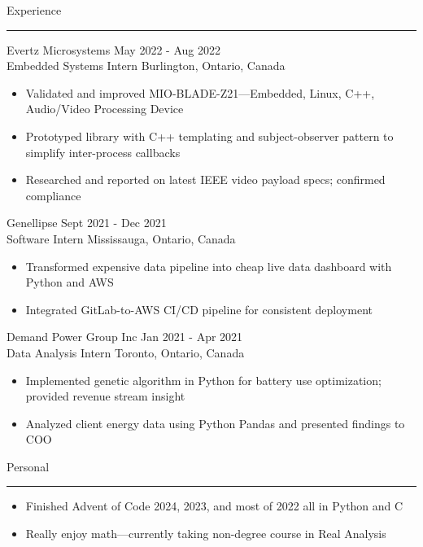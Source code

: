 \documentclass{article}
\newenvironment{mysection}[1]
{ {\large #1}

	\vspace{-1em}
	\rule{\linewidth}{0.4pt} 

} { \vspace{1em} }
\begin{document}
\begin{mysection}{Experience}
Evertz Microsystems \hfill May 2022 - Aug 2022 \\
Embedded Systems Intern \hfill Burlington, Ontario, Canada
\begin{itemize}[noitemsep,left=0pt,label={--}]
	\item Validated and improved MIO-BLADE-Z21—Embedded, Linux, C++, Audio/Video Processing Device
	\item Prototyped library with C++ templating and subject-observer pattern to simplify inter-process callbacks
	\item Researched and reported on latest IEEE video payload specs; confirmed compliance
\end{itemize}

Genellipse \hfill Sept 2021 - Dec 2021 \\
Software Intern \hfill Mississauga, Ontario, Canada
\begin{itemize}[noitemsep,left=0pt,label={--}]
	\item Transformed expensive data pipeline into cheap live data dashboard with Python and AWS 
	\item Integrated GitLab-to-AWS CI/CD pipeline for consistent deployment
\end{itemize}

Demand Power Group Inc \hfill Jan 2021 - Apr 2021 \\
Data Analysis Intern \hfill Toronto, Ontario, Canada
\begin{itemize}[noitemsep,left=0pt,label={--}]
	\item Implemented genetic algorithm in Python for battery use optimization; provided revenue stream insight
	\item Analyzed client energy data using Python Pandas and presented findings to COO
\end{itemize}
\end{mysection}

\begin{mysection}{Personal}
\begin{itemize}[noitemsep,left=0pt,label={--}]
	\item Finished Advent of Code 2024, 2023, and most of 2022 all in Python and C
	\item Really enjoy math---currently taking non-degree course in Real Analysis
\end{itemize}
\end{mysection}
\end{document}
